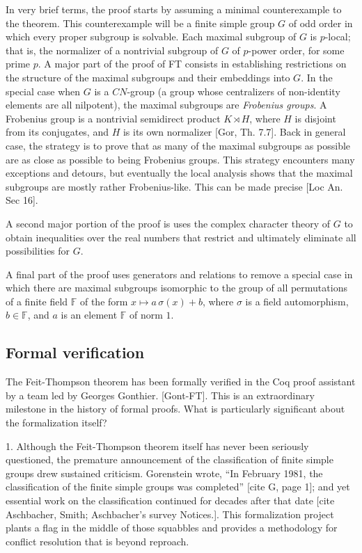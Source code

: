 \documentclass[brochure,english,12pt]{bourbaki}
\theoremstyle{plain}
\def\ring#1{{\mathbb{#1}}}
\begin{document}
In very brief terms, the proof starts by assuming a minimal counterexample to the theorem.  This
counterexample will be a finite simple group $G$ of odd order in which every proper subgroup is solvable.
Each maximal subgroup of $G$ is $p$-local; that is, the normalizer of a nontrivial subgroup
of $G$ of $p$-power order, for some prime $p$.  A major part of the proof of FT consists in establishing
restrictions on the structure of the maximal subgroups and their embeddings into $G$.
In the special case when $G$ is a $CN$-group (a group whose centralizers of non-identity elements are all nilpotent),
the maximal subgroups are {\it Frobenius groups}.  A Frobenius group is
a nontrivial semidirect product $K\rtimes H$, where $H$ is disjoint from its conjugates, and $H$ is its own normalizer [Gor, Th. 7.7].
Back in general case, the strategy is to prove that as many of the maximal subgroups as possible are as close as possible to
being Frobenius groups.  This strategy encounters many exceptions and detours, but eventually the local
analysis shows that the maximal subgroups are mostly rather Frobenius-like. 
This can be made precise [Loc An. Sec 16].


A second major portion of the proof is uses the complex character theory of $G$ to obtain inequalities over the real numbers
that restrict and ultimately eliminate all possibilities for $G$. 

A final part of the proof uses generators and relations to remove a special case in which there
are maximal subgroups isomorphic to the group of all permutations of a finite field $\ring{F}$
of the form $x \mapsto a\, \sigma (x) + b$, where $\sigma$ is a field automorphism, $b\in\ring{F}$,
and $a$ is an element $\ring{F}$ of norm $1$.





\subsection{Formal verification}


The Feit-Thompson theorem has been formally verified in the Coq proof assistant by a team led by Georges Gonthier.
[Gont-FT].  This is an extraordinary milestone in the history of formal proofs.
What is particularly significant about the formalization itself?

1. Although the Feit-Thompson theorem itself has never been seriously questioned,
 the premature announcement of the classification of finite simple groups drew sustained criticism.
 Gorenstein wrote, ``In February 1981, the classification of the finite simple groups was
completed'' [cite G, page 1]; and yet essential work on the classification
continued for decades after that date [cite Aschbacher, Smith; Aschbacher's survey Notices.].
This formalization project plants a flag in the middle of those squabbles and provides a
methodology for conflict resolution that is beyond reproach.
\end{document}
